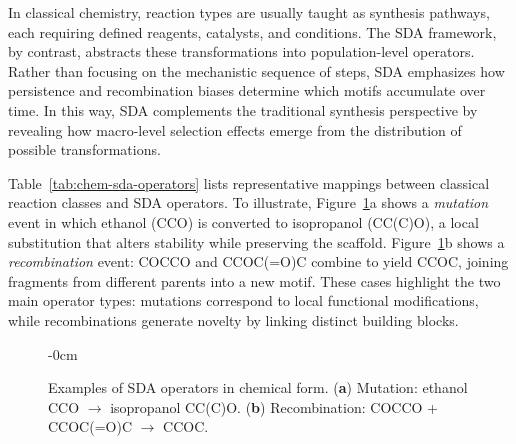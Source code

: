 \documentclass[life,article,submit,pdftex,moreauthors]{Definitions/mdpi}
\begin{document}
In classical chemistry, reaction types are usually taught as synthesis pathways, 
each requiring defined reagents, catalysts, and conditions. The SDA framework, 
by contrast, abstracts these transformations into population-level operators. 
Rather than focusing on the mechanistic sequence of steps, SDA emphasizes how 
persistence and recombination biases determine which motifs accumulate over time. 
In this way, SDA complements the traditional synthesis perspective by revealing 
how macro-level selection effects emerge from the distribution of possible 
transformations.  

Table~\ref{tab:chem-sda-operators} lists representative mappings between 
classical reaction classes and SDA operators. To illustrate, 
Figure~\ref{fig:mutation-recombination}a shows a \textit{mutation} event in 
which ethanol (CCO) is converted to isopropanol (CC(C)O), a local substitution 
that alters stability while preserving the scaffold. 
Figure~\ref{fig:mutation-recombination}b shows a \textit{recombination} event: 
COCCO and CCOC(=O)C combine to yield CCOC, joining fragments from different 
parents into a new motif. These cases highlight the two main operator types: 
mutations correspond to local functional modifications, while recombinations 
generate novelty by linking distinct building blocks.



\begin{figure}[H]
\begin{adjustwidth}{-\extralength}{0cm}
\centering
{}
\hspace{0.4cm}
\end{adjustwidth}
\caption{Examples of SDA operators in chemical form. (\textbf{a}) Mutation: ethanol CCO $\to$ isopropanol CC(C)O. 
(\textbf{b}) Recombination: COCCO + CCOC(=O)C $\to$ CCOC.}
\label{fig:mutation-recombination}
\end{figure}
\end{document}
